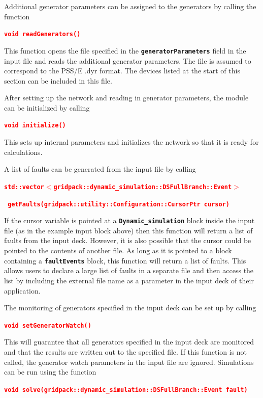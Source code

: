 \documentclass[12pt]{report} %
\begin{document}
Additional generator parameters can be assigned to the generators by calling the function

\textcolor{red}{\texttt{\textbf{void readGenerators()}}}

This function opens the file specified in the \texttt{\textbf{generatorParameters}} field in the input file and reads the additional generator parameters. The file is assumed to correspond to the PSS/E .dyr format. The devices listed at the start of this section can be included in this file.

After setting up the network and reading in generator parameters, the module can be initialized by calling

\textcolor{red}{\texttt{\textbf{void initialize()}}}

This sets up internal parameters and initializes the network so that it is ready for calculations.

A list of faults can be generated from the input file by calling

\textcolor{red}{\texttt{\textbf{std::vector$\boldsymbol{\mathrm{<}}$gridpack::dynamic\_simulation::DSFullBranch::Event$\boldsymbol{\mathrm{>}}$}}}

\textcolor{red}{\texttt{\textbf{  getFaults(gridpack::utility::Configuration::CursorPtr cursor)}}}

If the cursor variable is pointed at a \texttt{\textbf{Dynamic\_simulation}} block inside the input file (as in the example input block above) then this function will return a list of faults from the input deck. However, it is also possible that the cursor could be pointed to the contents of another file. As long as it is pointed to a block containing a \texttt{\textbf{faultEvents}} block, this function will return a list of faults. This allows users to declare a large list of faults in a separate file and then access the list by including the external file name as a parameter in the input deck of their application.

The monitoring of generators specified in the input deck can be set up by calling

\textcolor{red}{\texttt{\textbf{void setGeneratorWatch()}}}

This will guarantee that all generators specified in the input deck are monitored and that the results are written out to the specified file. If this function is not called, the generator watch parameters in the input file are ignored.
Simulations can be run using the function

\textcolor{red}{\texttt{\textbf{void solve(gridpack::dynamic\_simulation::DSFullBranch::Event fault)}}}
\end{document}
